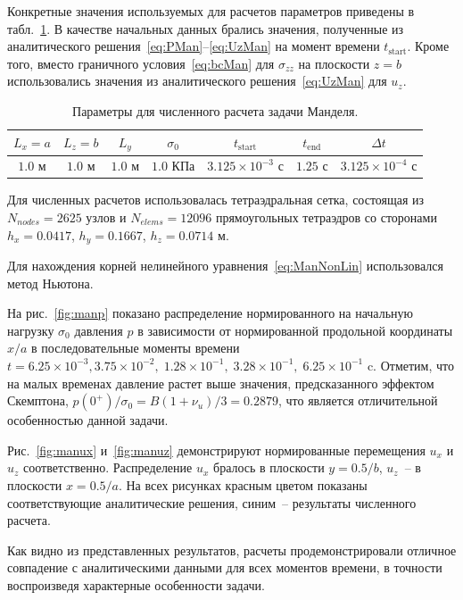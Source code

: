 Конкретные значения используемых для расчетов параметров приведены в табл.~\ref{tab:mandel}.
В качестве начальных данных брались значения, полученные из аналитического решения~\eqref{eq:PMan}--\eqref{eq:UzMan} на
момент времени $t_{\text{start}}$. Кроме того, вместо граничного условия~\eqref{eq:bcMan} для $\sigma_{zz}$ на плоскости $z = b$
использовались значения из аналитического решения~\eqref{eq:UzMan} для $u_z$.
%
\begin{table}[h!]
\centering
%
\renewcommand{\arraystretch}{1.5}
\renewcommand{\tabcolsep}{6 pt} 
\begin{tabular}{|c|c|c|c|c|c|c|}
\hline
$L_x = a$ & $L_z = b$ & $L_y$ & $\sigma_0$ & $t_{\text{start}}$ & $t_{\text{end}}$ & $\Delta t$\\
\hline
 $1.0$ м & $1.0$ м & $1.0$ м & $1.0$ КПа & $3.125\times 10^{-3}$ с & $1.25$ с & $3.125\times 10^{-4}$ с\\
\hline
\end{tabular}
%
\caption{Параметры для численного расчета задачи Манделя.}\label{tab:mandel}
\end{table}
%

Для численных расчетов использовалась тетраэдральная сетка, состоящая из 
$N_{nodes} = 2625$ узлов и $N_{elems} = 12096$ прямоугольных тетраэдров со сторонами
$h_x = 0.0417$, $h_y = 0.1667$, $h_z = 0.0714$ м. 

Для нахождения корней нелинейного уравнения~\eqref{eq:ManNonLin} использовался метод Ньютона.

На рис.~\ref{fig:manp} показано распределение нормированного на начальную нагрузку $\sigma_0$ давления $p$ в зависимости
от нормированной продольной координаты $x/a$ в последовательные моменты времени
$t = 6.25 \times 10^{-3}, 3.75 \times 10^{-2},\; 1.28\times 10^{-1}, \; 3.28\times 10^{-1},\; 6.25\times 10^{-1}$ c.
Отметим, что на малых временах давление растет выше значения, предсказанного эффектом Скемптона,
$p(0^+)/\sigma_0 = B(1+\nu_u)/3 = 0.2879$, что является отличительной особенностью данной задачи. 

Рис.~\ref{fig:manux} и~\ref{fig:manuz} демонстрируют нормированные
перемещения $u_x$ и $u_z$ соответственно. Распределение $u_x$ бралось в плоскости $y=0.5/b$,
$u_z$~-- в плоскости $x=0.5/a$.
На всех рисунках красным цветом показаны
соответствующие аналитические решения, синим~-- результаты численного расчета.

Как видно из представленных результатов, расчеты продемонстрировали отличное совпадение с аналитическими
данными для всех моментов времени, в точности воспроизведя характерные особенности задачи. 

